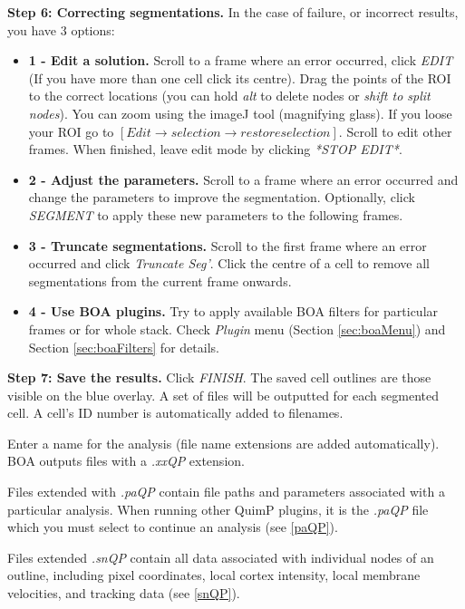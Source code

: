 \documentclass[a4paper,12pt]{article}
\begin{document}
\textbf{Step 6: Correcting segmentations.}  In the case of failure, or incorrect results, you have 3 options:

\begin{itemize}
\item \textbf{1 - Edit a solution.} Scroll to a frame where an error occurred, click \textit{EDIT} (If you have more than one cell
click its centre). Drag the points of the ROI to the correct locations (you can hold \textit{alt} to delete nodes or \textit{shift to split nodes}).
You can zoom using the imageJ tool (magnifying glass). If you loose your ROI go to $[Edit\rightarrow selection\rightarrow restore selection]$.
Scroll to edit other frames.  When finished, leave edit mode by clicking \textit{*STOP EDIT*}.
\item \textbf{2 - Adjust the parameters.}  Scroll to a frame where an error occurred and change the parameters to improve the segmentation.
Optionally, click \textit{SEGMENT} to apply these new parameters to the following frames.
\item \textbf{3 - Truncate segmentations.}  Scroll to the first frame where an error occurred and click \textit{Truncate Seg'}.  Click the centre
of a cell to remove all segmentations from the current frame onwards.
\item \textbf{4 - Use BOA plugins.} Try to apply available BOA filters for particular frames or for whole stack. Check \textit{Plugin} menu (Section \ref{sec:boaMenu}) and Section \ref{sec:boaFilters} for details.
\end{itemize}


\textbf{Step 7: Save the results.}  Click \textit{FINISH}.  The saved cell outlines are those visible on the blue overlay.
A set of files will be outputted for each segmented cell.  A cell's ID number is automatically added to filenames.

Enter a name for the analysis (file name extensions are added automatically). BOA outputs files with a \textit{.xxQP} extension.

Files extended  with \textit{.paQP} contain file paths and parameters associated with a particular analysis.  
When running other QuimP plugins, it is the \textit{.paQP} file which you must select to continue an analysis (see \ref{paQP}).

Files extended \textit{.snQP} contain all data associated with individual nodes of an outline, including pixel coordinates, local cortex 
intensity, local membrane velocities, and tracking data (see \ref{snQP}).
\end{document}
